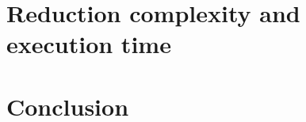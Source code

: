 \documentclass[conference,onecolumn]{IEEEtran}
\begin{document}
\section{Reduction complexity and execution time}
\section{Conclusion}

\end{document}
